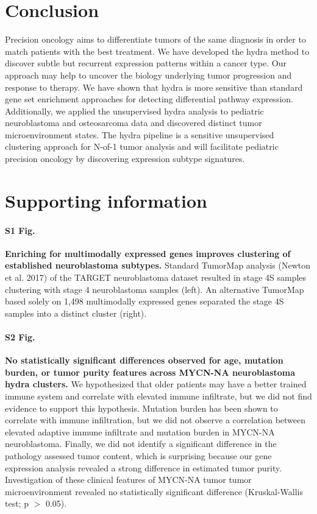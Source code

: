 \documentclass[10pt,letterpaper]{article}
\begin{document}
\section*{Conclusion}
Precision oncology aims to differentiate tumors of the same diagnosis in order to match patients with the best treatment. We have developed the hydra method to discover subtle but recurrent expression patterns within a cancer type. Our approach may help to uncover the biology underlying tumor progression and response to therapy. We have shown that hydra is more sensitive than standard gene set enrichment approaches for detecting differential pathway expression. Additionally, we applied the unsupervised hydra analysis to pediatric neuroblastoma and osteosarcoma data and discovered distinct tumor microenvironment states. The hydra pipeline is a sensitive unsupervised clustering approach for N-of-1 tumor analysis and will facilitate pediatric precision oncology by discovering expression subtype signatures.

\section*{Supporting information}

\paragraph*{S1 Fig.}
\label{S1_Fig}
{\bf Enriching for multimodally expressed genes improves clustering of established neuroblastoma subtypes.} Standard TumorMap analysis (Newton et al. 2017) of the TARGET neuroblastoma dataset resulted in stage 4S samples clustering with stage 4 neuroblastoma samples (left). An alternative TumorMap based solely on 1,498 multimodally expressed genes separated the stage 4S samples into a distinct cluster (right).

\paragraph*{S2 Fig.}
\label{S2_Fig}
{\bf No statistically significant differences observed for age, mutation burden, or tumor purity features across MYCN-NA neuroblastoma hydra clusters.} We hypothesized that older patients may have a better trained immune system and correlate with elevated immune infiltrate, but we did not find evidence to support this hypothesis. Mutation burden has been shown to correlate with immune infiltration, but we did not observe a correlation between elevated adaptive immune infiltrate and mutation burden in MYCN-NA neuroblastoma. Finally, we did not identify a significant difference in the pathology assessed tumor content, which is surprising because our gene expression analysis revealed a strong difference in estimated tumor purity. Investigation of these clinical features of MYCN-NA tumor tumor microenvironment revealed no statistically significant difference (Kruskal-Wallis test; p $>$ 0.05).
\end{document}

